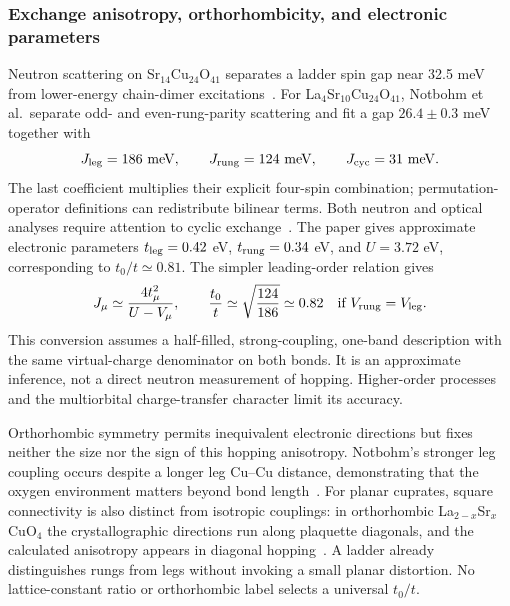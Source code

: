 \documentclass[11pt,letterpaper]{article}
\begin{document}
\subsubsection*{Exchange anisotropy, orthorhombicity, and electronic parameters}
Neutron scattering on Sr$_{14}$Cu$_{24}$O$_{41}$ separates a ladder spin
gap near 32.5 meV from lower-energy chain-dimer excitations~\citep{Eccleston1998}.
For La$_4$Sr$_{10}$Cu$_{24}$O$_{41}$, Notbohm et al.\ separate odd- and
even-rung-parity scattering and fit a gap $26.4\pm0.3$ meV together with
\begin{equation}
 J_{\rm leg}=186\ {\rm meV},\qquad J_{\rm rung}=124\ {\rm meV},\qquad
 J_{\rm cyc}=31\ {\rm meV}.
 \label{eq:notbohm-exchange}
\end{equation}
The last coefficient multiplies their explicit four-spin combination;
permutation-operator definitions can redistribute bilinear terms.
Both neutron and optical analyses require attention to cyclic
exchange~\citep{Notbohm2007,Nunner2002,Schmidt2005}.
The paper gives approximate electronic parameters $t_{\rm leg}=0.42$ eV,
$t_{\rm rung}=0.34$ eV, and $U=3.72$ eV, corresponding to $t_0/t\simeq0.81$.
The simpler leading-order relation gives
\begin{equation}
 J_\mu\simeq\frac{4t_\mu^2}{U-V_\mu},\qquad
 \frac{t_0}{t}\simeq\sqrt{\frac{124}{186}}\simeq0.82
 \quad\hbox{if }V_{\rm rung}=V_{\rm leg}.
 \label{eq:hopping-inference}
\end{equation}
This conversion assumes a half-filled, strong-coupling, one-band description
with the same virtual-charge denominator on both bonds. It is an approximate
inference, not a direct neutron measurement of hopping. Higher-order processes
and the multiorbital charge-transfer character limit its accuracy.

Orthorhombic symmetry permits inequivalent electronic directions but fixes
neither the size nor the sign of this hopping anisotropy. Notbohm's stronger
leg coupling occurs despite a longer leg Cu--Cu distance, demonstrating
that the oxygen environment matters beyond bond length~\citep{Notbohm2007}.
For planar cuprates, square connectivity is also distinct from isotropic
couplings: in orthorhombic La$_{2-x}$Sr$_x$CuO$_4$ the crystallographic
directions run along plaquette diagonals, and the calculated anisotropy
appears in diagonal hopping~\citep{Sushkov2008}. A ladder already distinguishes
rungs from legs without invoking a small planar distortion. No lattice-constant
ratio or orthorhombic label selects a universal $t_0/t$.
\end{document}
